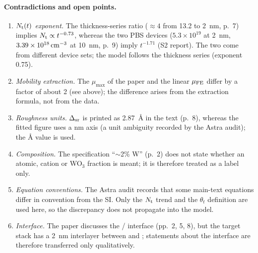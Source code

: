 \paragraph{Contradictions and open points.}
\begin{enumerate}
\item \emph{$N_{\mathrm{t}}(t)$ exponent.} The thickness-series ratio ($\approx 4$ from 13.2 to \SI{2}{nm},
  p.~7) implies $N_{\mathrm{t}} \propto t^{-0.73}$, whereas the two PBS devices ($5.3\times10^{19}$ at
  \SI{2}{nm}, $3.39\times10^{18}\,\mathrm{cm}^{-3}$ at \SI{10}{nm}, p.~9) imply $t^{-1.71}$ (S2 report). The two
  come from different device sets; the model follows the thickness series (exponent 0.75).
\item \emph{Mobility extraction.} The $\mu_{\max}$ of the paper and the linear $\mu_{\mathrm{FE}}$ differ by a
  factor of about 2 (see above); the difference arises from the extraction formula, not from the data.
\item \emph{Roughness units.} $\Delta_{\mathrm{sr}}$ is printed as \SI{2.87}{\angstrom} in the text (p.~8), whereas the
  fitted figure uses a nm axis (a unit ambiguity recorded by the Astra audit); the \AA{} value is used.
\item \emph{Composition.} The specification ``$\sim$2\% W'' (p.~2) does not state whether an atomic,
  cation or WO$_3$ fraction is meant; it is therefore treated as a label only.
\item \emph{Equation conventions.} The Astra audit records that some main-text equations
  differ in convention from the SI. Only the $N_{\mathrm{t}}$ trend and the $\theta_t$ definition are used here,
  so the discrepancy does not propagate into the model.
\item \emph{Interface.} The paper discusses the \IWO/\HfO{} interface (pp.~2, 5, 8), but the target
  stack has a \SI{2}{nm} \AlO{} interlayer between \HfO{} and \IWO; statements about the interface are
  therefore transferred only qualitatively.
\end{enumerate}
